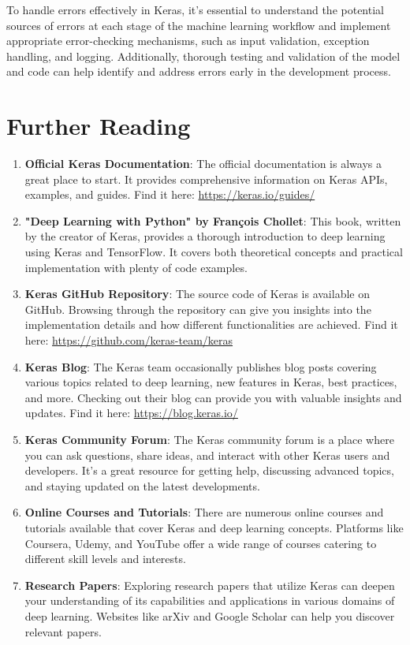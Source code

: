 			To handle errors effectively in Keras, it's essential to understand the potential sources of errors at each stage of the machine learning workflow and implement appropriate error-checking mechanisms, such as input validation, exception handling, and logging. Additionally, thorough testing and validation of the model and code can help identify and address errors early in the development process.
			
			
		\section{Further Reading}

	\begin{enumerate}
		\item \textbf{Official Keras Documentation}: The official documentation is always a great place to start. It provides comprehensive information on Keras APIs, examples, and guides.
			Find it here: \url{https://keras.io/guides/}\cite{keras:2024}
		
		\item \textbf{"Deep Learning with Python" by François Chollet}: This book, written by the creator of Keras, provides a thorough introduction to deep learning using Keras and TensorFlow. It covers both theoretical concepts and practical implementation with plenty of code examples.\cite{krebbs:2018}
		
		\item \textbf{Keras GitHub Repository}: The source code of Keras is available on GitHub. Browsing through the repository can give you insights into the implementation details and how different functionalities are achieved. Find it here: \url{https://github.com/keras-team/keras} 
		
		\item \textbf{Keras Blog}: The Keras team occasionally publishes blog posts covering various topics related to deep learning, new features in Keras, best practices, and more. Checking out their blog can provide you with valuable insights and updates.	Find it here: \url{https://blog.keras.io/} 
		
		\item \textbf{Keras Community Forum}: The Keras community forum is a place where you can ask questions, share ideas, and interact with other Keras users and developers. It's a great resource for getting help, discussing advanced topics, and staying updated on the latest developments.
		
		\item \textbf{Online Courses and Tutorials}: There are numerous online courses and tutorials available that cover Keras and deep learning concepts. Platforms like Coursera, Udemy, and YouTube offer a wide range of courses catering to different skill levels and interests.
		
		\item \textbf{Research Papers}: Exploring research papers that utilize Keras can deepen your understanding of its capabilities and applications in various domains of deep learning. Websites like arXiv and Google Scholar can help you discover relevant papers.
	\end{enumerate}

